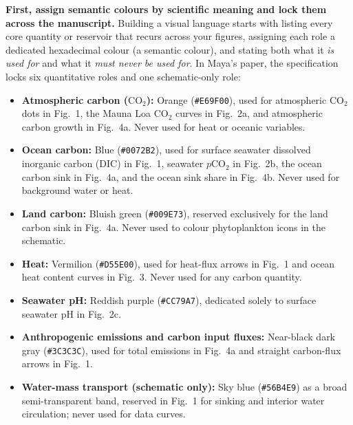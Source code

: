 \textbf{First, assign semantic colours by scientific meaning and lock them across the manuscript.} Building a visual language starts with listing every core quantity or reservoir that recurs across your figures, assigning each role a dedicated hexadecimal colour (a semantic colour), and stating both what it \textit{is used for} and what it \textit{must never be used for}. In Maya's paper, the specification locks six quantitative roles and one schematic-only role:
\begin{itemize}
\item \textbf{Atmospheric carbon ($\text{CO}_2$):} Orange (\texttt{\#E69F00}), used for atmospheric $\text{CO}_2$ dots in Fig.\ 1, the Mauna Loa $\text{CO}_2$ curves in Fig.\ 2a, and atmospheric carbon growth in Fig.\ 4a. Never used for heat or oceanic variables.
\item \textbf{Ocean carbon:} Blue (\texttt{\#0072B2}), used for surface seawater dissolved inorganic carbon (DIC) in Fig.\ 1, seawater $p\text{CO}_2$ in Fig.\ 2b, the ocean carbon sink in Fig.\ 4a, and the ocean sink share in Fig.\ 4b. Never used for background water or heat.
\item \textbf{Land carbon:} Bluish green (\texttt{\#009E73}), reserved exclusively for the land carbon sink in Fig.\ 4a. Never used to colour phytoplankton icons in the schematic.
\item \textbf{Heat:} Vermilion (\texttt{\#D55E00}), used for heat-flux arrows in Fig.\ 1 and ocean heat content curves in Fig.\ 3. Never used for any carbon quantity.
\item \textbf{Seawater pH:} Reddish purple (\texttt{\#CC79A7}), dedicated solely to surface seawater pH in Fig.\ 2c.
\item \textbf{Anthropogenic emissions and carbon input fluxes:} Near-black dark gray (\texttt{\#3C3C3C}), used for total emissions in Fig.\ 4a and straight carbon-flux arrows in Fig.\ 1.
\item \textbf{Water-mass transport (schematic only):} Sky blue (\texttt{\#56B4E9}) as a broad semi-transparent band, reserved in Fig.\ 1 for sinking and interior water circulation; never used for data curves.
\end{itemize}

